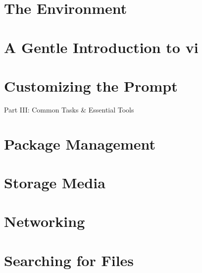 \documentclass[oneside]{book}
\numberwithin{equation}{section}
\begin{document}
\section{The Environment}


\section{A Gentle Introduction to vi}


\section{Customizing the Prompt}


\begin{center}
	\huge Part III: Common Tasks \& Essential Tools
\end{center}


\section{Package Management}


\section{Storage Media}


\section{Networking}


\section{Searching for Files}
\end{document}

